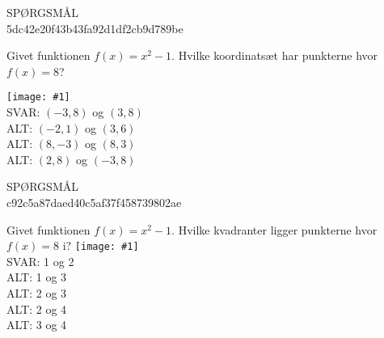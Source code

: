 \documentclass[]{article}
\newenvironment{question}[2]{SPØRGSMÅL\\}{\hspace{50px}}
\newcommand{\image}[1]{\texttt{[image: \#1]}\\}
\newcommand{\answer}[1]{{\color{green} SVAR: #1}\\}
\newcommand{\alt}[1]{{\color{red} ALT: #1}\\}
\begin{document}
\begin{question}{multi}\id{5dc42e20f43b43fa92d1df2cb9d789be}
    
    Givet funktionen $f(x)=x^2 - 1$. Hvilke koordinatsæt har punkterne hvor $f(x)=8$?

    \image{andengradsfunktioner.png}

    \answer{$(-3, 8)$ og $(3, 8)$}
    \alt{$(-2, 1)$ og $(3, 6)$}
    \alt{$(8, -3)$ og $(8, 3)$}
    \alt{$(2, 8)$ og $(-3, 8)$}

\end{question}

\begin{question}{multi}\id{c92c5a87daed40c5af37f458739802ae}
    
    Givet funktionen $f(x)=x^2 - 1$. Hvilke kvadranter ligger punkterne hvor $f(x)=8$ i?
    \image{andengradsfunktionermedpunkter.png}

    \answer{1 og 2}
    \alt{1 og 3}
    \alt{2 og 3}
    \alt{2 og 4}
    \alt{3 og 4}

\end{question}
\end{document}
